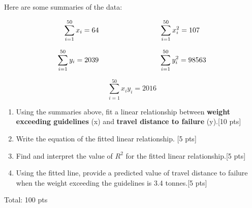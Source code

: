 \documentclass[11pt]{article}\usepackage[]{graphicx}\usepackage[]{color}
\begin{document}
\begin{enumerate}
Here are some summaries of the data:

$$
\sum_{i=1}^{50} x_i = 64 \hspace{3cm} \sum_{i=1}^{50} x_i^2 = 107 \\
$$

$$
\sum_{i=1}^{50} y_i = 2039 \hspace{3cm} \sum_{i=1}^{50} y_i^2 = 98563 \\
$$

$$
\sum_{i=1}^{50} x_i y_i = 2016
$$

\begin{enumerate}
       \item  Using the summaries above, fit a linear relationship between \textbf{weight exceeding guidelines} (x) and \textbf{travel distance to failure} (y).[10 pts]
   

      \item Write the equation of the fitted linear relationship. [5 pts] 
      \vspace{2cm}
      \item Find and interpret the value of $R^2$ for the fitted linear relationship.[5 pts]
      \vspace{2cm}
      \item Using the fitted line, provide a predicted value of travel distance to failure when the weight exceeding the guidelines is 3.4 tonnes.[5 pts]
      \vspace{2cm}

% 
% 
% 
% 

\end{enumerate}

\end{enumerate}	

Total: 100 pts
\end{document}
